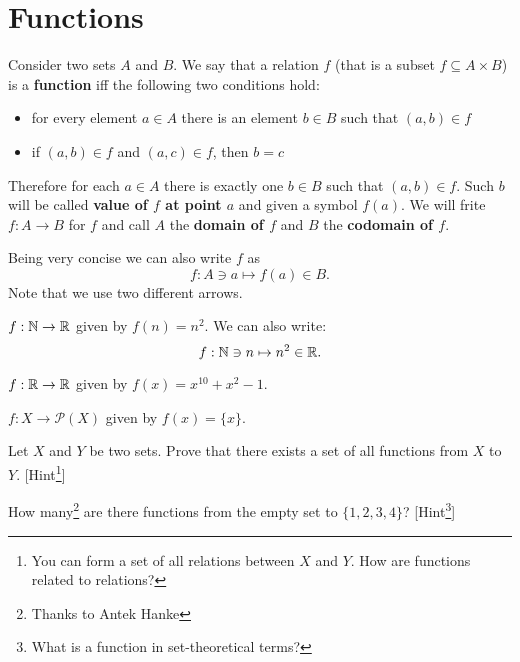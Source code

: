 \section{Functions}
\label{sec:intro_to_functions}

\begin{definition}
  Consider two sets $A$ and $B$. We say that a relation $f$ (that is a subset $f\subseteq A\times B$) is a \textbf{function}
  iff the following two conditions hold:
  \begin{itemize}
    \item for every element $a\in A$ there is an element $b\in B$ such that $(a,b)\in f$
    \item if $(a,b)\in f$ and $(a,c)\in f$, then $b=c$
  \end{itemize}
  Therefore for each $a\in A$ there is exactly one $b\in B$ such that $(a,b)\in f$. Such $b$ will be called \textbf{value of $f$ at point $a$} and given a symbol $f(a).$
  We will frite $f: A\to B$ for $f$ and call $A$ the \textbf{domain of $f$} and $B$ the \textbf{codomain of $f$}.

  Being very concise we can also write $f$ as
  $$f: A\ni a \mapsto f(a)\in B.$$
  Note that we use two different arrows.
\end{definition}

\begin{example}
  $f: \mathbb N\to \mathbb R$ given by $f(n)=n^2$. We can also write: $$f: \mathbb N\ni n\mapsto n^2\in \mathbb R.$$
\end{example}

\begin{example}
  $f: \mathbb R\to \mathbb R$ given by $f(x)=x^{10}+x^2-1$.
\end{example}

\begin{example}
  $f: X\to \mathcal P(X)$ given by $f(x)=\{x\}$.
\end{example}

\begin{exercise}
  Let $X$ and $Y$ be two sets. Prove that there exists a set of all functions from $X$ to $Y$. [Hint\footnote{You can form a set of all relations between $X$ and $Y$. How are functions related to relations?}]
\end{exercise}

\begin{exercise}
	How many\footnote{Thanks to Antek Hanke} are there functions from the empty set to $\{1,2,3,4\}$? [Hint\footnote{What is a function in set-theoretical terms?}]
\end{exercise}

